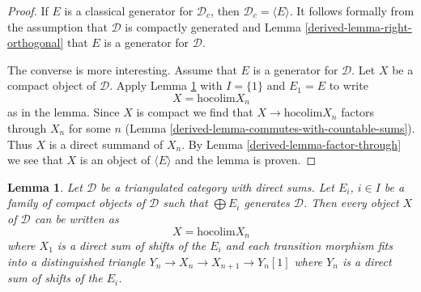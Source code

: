 \documentclass{amsart}
\theoremstyle{plain}
\newtheorem{lemma}[subsection]{Lemma}
\theoremstyle{definition}
\theoremstyle{remark}
\numberwithin{equation}{subsection}
\begin{document}
\begin{proof}
If $E$ is a classical generator for $\mathcal{D}_c$, then
$\mathcal{D}_c = \langle E \rangle$. It follows formally
from the assumption that $\mathcal{D}$ is compactly generated
and Lemma \ref{derived-lemma-right-orthogonal} that $E$ is a generator
for $\mathcal{D}$.

\medskip\noindent
The converse is more interesting. Assume that $E$ is a generator
for $\mathcal{D}$. Let $X$ be a compact object of $\mathcal{D}$.
Apply Lemma \ref{derived-lemma-write-as-colimit} with $I = \{1\}$ and
$E_1 = E$ to write
$$
X = \text{hocolim} X_n
$$
as in the lemma. Since $X$ is compact we
find that $X \to \text{hocolim} X_n$ factors through $X_n$ for
some $n$ (Lemma \ref{derived-lemma-commutes-with-countable-sums}).
Thus $X$ is a direct summand of $X_n$.
By Lemma \ref{derived-lemma-factor-through} we see that $X$ is an
object of $\langle E \rangle$ and the lemma is proven.
\end{proof}


\begin{lemma}
\label{derived-lemma-write-as-colimit}
Let $\mathcal{D}$ be a triangulated category with direct sums.
Let $E_i$, $i \in I$ be a family of compact objects of $\mathcal{D}$
such that $\bigoplus E_i$ generates $\mathcal{D}$.
Then every object $X$ of $\mathcal{D}$ can be written as
$$
X = \text{hocolim} X_n
$$
where $X_1$ is a direct sum of shifts of the $E_i$ and each transition
morphism fits into a distinguished triangle
$Y_n \to X_n \to X_{n + 1} \to Y_n[1]$
where $Y_n$ is a direct sum of shifts of the $E_i$.
\end{lemma}
\end{document}
